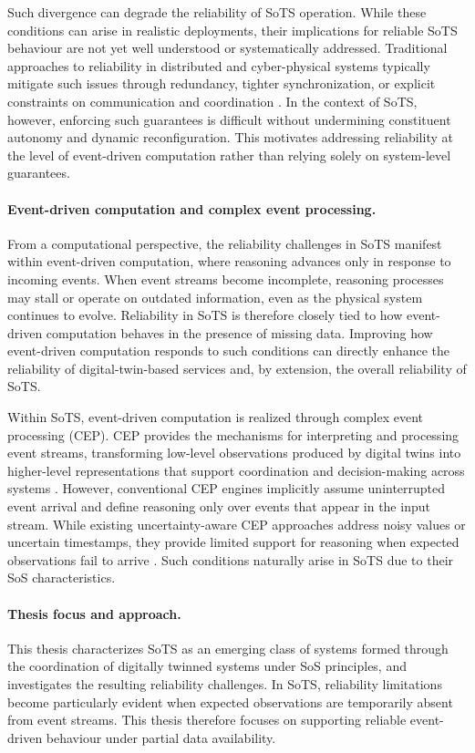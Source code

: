 Such divergence can degrade the reliability of SoTS operation. While these conditions can arise in realistic deployments, their implications for reliable SoTS behaviour are not yet well understood or systematically addressed. Traditional approaches to reliability in distributed and cyber-physical systems typically mitigate such issues through redundancy, tighter synchronization, or explicit constraints on communication and coordination \cite{hanmer2013patterns, chavan2024fault}. In the context of SoTS, however, enforcing such guarantees is difficult without undermining constituent autonomy and dynamic reconfiguration. This motivates addressing reliability at the level of event-driven computation rather than relying solely on system-level guarantees.

\paragraph{Event-driven computation and complex event processing.}
From a computational perspective, the reliability challenges in SoTS manifest within event-driven computation, where reasoning advances only in response to incoming events. When event streams become incomplete, reasoning processes may stall or operate on outdated information, even as the physical system continues to evolve. Reliability in SoTS is therefore closely tied to how event-driven computation behaves in the presence of missing data. Improving how event-driven computation responds to such conditions can directly enhance the reliability of digital-twin-based services and, by extension, the overall reliability of SoTS.

Within SoTS, event-driven computation is realized through complex event processing (CEP). CEP provides the mechanisms for interpreting and processing event streams, transforming low-level observations produced by digital twins into higher-level representations that support coordination and decision-making across systems \citep{luckham2002power}. However, conventional CEP engines implicitly assume uninterrupted event arrival and define reasoning only over events that appear in the input stream. While existing uncertainty-aware CEP approaches address noisy values or uncertain timestamps, they provide limited support for reasoning when expected observations fail to arrive \citep{alevizos2017probabilistic}. Such conditions naturally arise in SoTS due to their SoS characteristics.


\paragraph{Thesis focus and approach.}
This thesis characterizes SoTS as an emerging class of systems formed through the coordination of digitally twinned systems under SoS principles, and investigates the resulting reliability challenges. In SoTS, reliability limitations become particularly evident when expected observations are temporarily absent from event streams. This thesis therefore focuses on supporting reliable event-driven behaviour under partial data availability.

